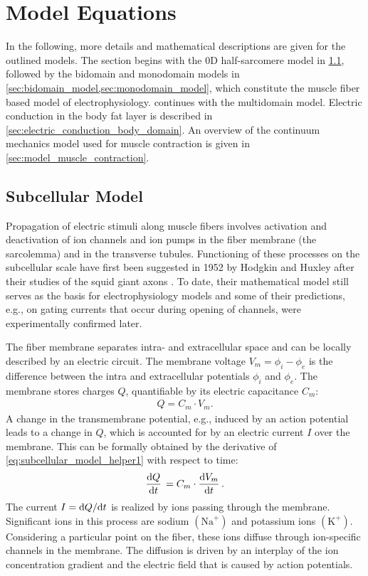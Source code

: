 \section{Model Equations}\label{sec:model_equations}
In the following, more details and mathematical descriptions are given for the outlined models. The section begins with the 0D half-sarcomere model in \cref{sec:subcelullar_model}, followed by the bidomain and monodomain models in \cref{sec:bidomain_model,sec:monodomain_model}, which constitute the muscle fiber based model of electrophysiology.  continues with the multidomain model. Electric conduction in the body fat layer is described in \cref{sec:electric_conduction_body_domain}. An overview of the continuum mechanics model used for muscle contraction is given in \cref{sec:model_muscle_contraction}.
\subsection{Subcellular Model}\label{sec:subcelullar_model}

Propagation of electric stimuli along muscle fibers involves activation and deactivation of ion channels and ion pumps in the fiber membrane  (the sarcolemma) and in the transverse tubules.
Functioning of these processes on the subcellular scale have first been suggested in 1952 by Hodgkin and Huxley after their studies of the squid giant axons \cite{Hodgkin1952,hodgkin1952propagation}. To date, their mathematical model still serves as the basis for electrophysiology models and some of their predictions, e.g., on gating currents that occur during opening of channels, were experimentally confirmed later.

The fiber membrane separates intra- and extracellular space and can be locally described by an electric circuit. The membrane voltage $V_m=\phi_i-\phi_e$ is the difference between the intra and extracellular potentials $\phi_i$ and $\phi_e$. The membrane stores charges $Q$, quantifiable by its electric capacitance $C_m$:
\begin{align}\label{eq:subcellular_model_helper1}
  Q = C_m\cdot V_m.  
\end{align}
%
A change in the transmembrane potential, e.g., induced by an action potential leads to a change in $Q$, which is accounted for by an electric current $I$ over the membrane. This can be formally obtained by the derivative of \cref{eq:subcellular_model_helper1} with respect to time:%
\begin{align}\label{eq:subcellular_model_helper2}
  \d{Q}{t} = C_m \cdot \d{V_m}{t}.
\end{align}
%
The current $I=\d Q / \d t$ is realized by ions passing through the membrane.
Significant ions in this process are sodium $(\text{Na}^{+})$ and potassium ions $(\text{K}^{+})$.
Considering a particular point on the fiber, these ions diffuse through ion-specific channels in the membrane.
The diffusion is driven by an interplay of the ion concentration gradient and the electric field that is caused by action potentials.

